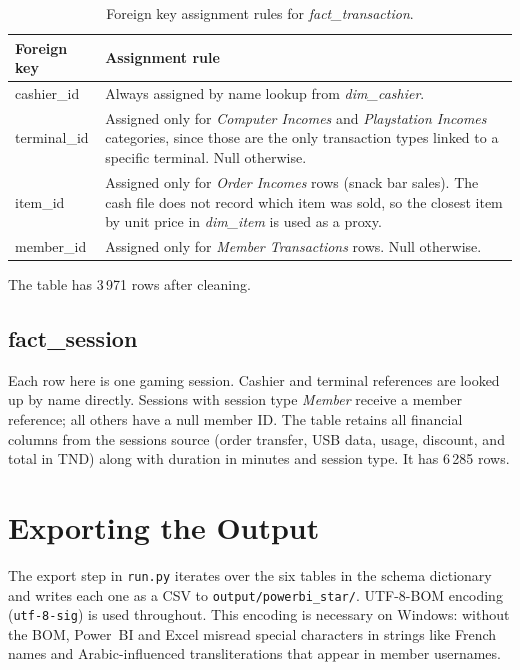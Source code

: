 \documentclass[12pt, a4paper]{report}
\begin{document}
\begin{table}[H]
  \centering
  \caption{Foreign key assignment rules for \textit{fact\_transaction}.\label{tab:fk_rules}}
  \begin{tabular}{p{3cm} p{9.5cm}}
    \toprule
    \textbf{Foreign key} & \textbf{Assignment rule} \\
    \midrule
    cashier\_id
      & Always assigned by name lookup from \textit{dim\_cashier}. \\[4pt]
    terminal\_id
      & Assigned only for \textit{Computer Incomes} and
        \textit{Playstation Incomes} categories, since those are the only
        transaction types linked to a specific terminal. Null otherwise. \\[4pt]
    item\_id
      & Assigned only for \textit{Order Incomes} rows (snack bar sales). The cash
        file does not record which item was sold, so the closest item by unit price
        in \textit{dim\_item} is used as a proxy. \\[4pt]
    member\_id
      & Assigned only for \textit{Member Transactions} rows. Null otherwise. \\
    \bottomrule
  \end{tabular}
\end{table}

The table has 3\,971 rows after cleaning.

\subsection{fact\_session}

Each row here is one gaming session. Cashier and terminal references are looked up
by name directly. Sessions with session type \textit{Member} receive a member
reference; all others have a null member ID. The table retains all financial columns
from the sessions source (order transfer, USB data, usage, discount, and total in
TND) along with duration in minutes and session type. It has 6\,285 rows.

\section{Exporting the Output}

The export step in \texttt{run.py} iterates over the six tables in the schema
dictionary and writes each one as a CSV to \texttt{output/powerbi\_star/}.
UTF-8-BOM encoding (\texttt{utf-8-sig}) is used throughout. This encoding is
necessary on Windows: without the BOM, Power~BI and Excel misread special characters
in strings like French names and Arabic-influenced transliterations that appear in
member usernames.
\end{document}

